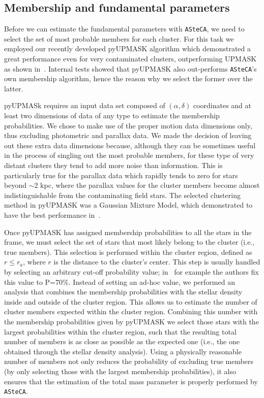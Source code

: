 \documentclass[draft]{aa}
\begin{document}
 \subsection{Membership and fundamental parameters}
  \label{ssec:fund_pars}

  Before we can estimate the fundamental parameters with \texttt{ASteCA}, we
  need to select the set of most probable members for each cluster. For this
  task we employed our recently developed pyUPMASK algorithm which demonstrated
  a great performance even for very contaminated clusters, outperforming
  UPMASK~\citep{Krone2014} as shown in~\cite{Pera_2021}. Internal tests
  showed that pyUPMASK also out-performs \texttt{ASteCA}'s own membership
  algorithm, hence the reason why we select the former over the latter.

  pyUPMASk requires an input data set composed of $(\alpha, \delta)$ coordinates
  and at least two dimensions of data of any type to estimate the membership
  probabilities. We chose to make use of the proper motion data dimensions only,
  thus excluding photometric and parallax data.
  We made the decision of leaving out these extra data dimensions because,
  although they can be sometimes useful in the process of singling out the most
  probable members, for these type of very distant clusters they tend to add
  more noise than information.
  This is particularly true for the parallax data which
  rapidly tends to zero for stars beyond $\sim$2 kpc, where the parallax values
  for the cluster members become almost indistinguishable from the contaminating
  field stars. The selected clustering method in pyUPMASK was a Gaussian Mixture
  Model, which demonstrated to have the best performance
  in~\citet[][see Sect. 4]{Pera_2021}.

  Once pyUPMASK has assigned membership probabilities to all the stars in the
  frame, we must select the set of stars that most likely belong to the
  cluster (i.e., true members). This selection is performed within the
  cluster region, defined as $r\leq r_{a}$, where $r$ is the distance to the
  cluster's center.
  This step is usually handled by selecting
  an arbitrary cut-off probability value; in~\cite{Cantat_2020} for example
  the authors fix this value to P=70\%. Instead of setting an ad-hoc value, we
  performed an analysis that combines the membership probabilities with the
  stellar density inside and outside of the cluster region. This allows us to
  estimate the number of cluster members expected within the cluster region.
  Combining this number with the membership probabilities given by pyUPMASK we
  select those stars with the largest probabilities within the cluster region,
  such that the resulting total number of members is as close as possible as the
  expected one (i.e., the one obtained through the stellar density analysis).
  Using a physically reasonable number of members not only reduces the
  probability of excluding true members (by only selecting those with the
  largest membership probabilities), it also ensures that the estimation of the
  total mass parameter is properly performed by \texttt{ASteCA}.\\
\end{document}
